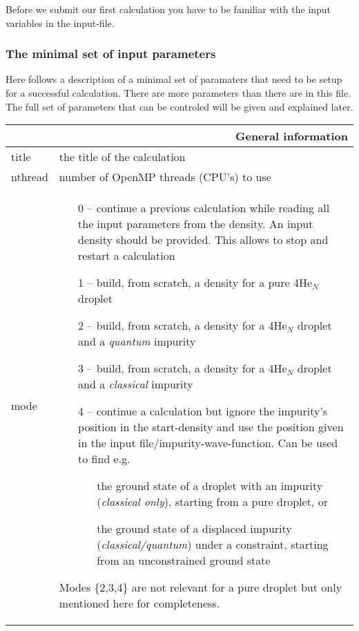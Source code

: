 \documentclass[10pt,a4paper]{article}
\begin{document}
	Before we submit our first calculation you have to be familiar with the input variables in the input-file.
	
	\subsubsection{The minimal set of input parameters}
	Here follows a description of a minimal set of paramaters that need to be setup for a successful calculation. There are more parameters than there are in this file. The full set of parameters that can be controled will be given and explained later.

	\begin{center}
	\begin{tabular}{l|p{9.6cm}}
		\multicolumn{2}{r}{\textbf{General information}} \\
		\hline\hline
		title		& the title of the calculation	\\
		\hline
		nthread		& number of OpenMP threads (CPU's) to use	\\
		\hline
		mode		&
		\begin{enumerate}
			\item[0 --] continue a previous calculation while reading all the input parameters from the density. An input density should be provided. This allows to stop and restart a calculation
			\item[1 --] build, from scratch, a density for a pure 4He$_N$ droplet
			\item[2 --] build, from scratch, a density for a 4He$_N$ droplet and a \emph{quantum} impurity
			\item[3 --] build, from scratch,  a density for a 4He$_N$ droplet and a \emph{classical} impurity
			\item[4 --] continue a calculation but ignore the impurity's position in the start-density and use the position given in the input file/impurity-wave-function. Can be used to find e.g.
			\begin{itemize}
				\item[\ding{105}] the ground state of a droplet with an impurity (\emph{classical only}), starting from a pure droplet, or 
				\item[\ding{105}] the ground state of a displaced impurity (\emph{classical/quantum}) under a constraint, starting from an unconstrained ground state
			\end{itemize}
		\end{enumerate}
		\vspace{10px}
		Modes \{2,3,4\} are not relevant for a pure droplet but only mentioned here for completeness.
	\end{tabular}
	

\end{center}
\end{document}
